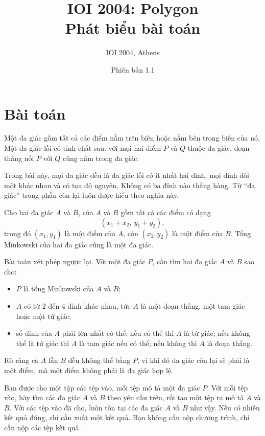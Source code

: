 \documentclass[11pt]{article}
\title{IOI 2004: Polygon\\{\large Phát biểu bài toán}}
\author{IOI 2004, Athens}
\date{Phiên bản 1.1}
\begin{document}
\maketitle


\section{Bài toán}

Một đa giác gồm tất cả các điểm nằm trên biên hoặc nằm bên trong biên của nó.
Một đa giác lồi có tính chất sau: với mọi hai điểm \(P\) và \(Q\) thuộc đa
giác, đoạn thẳng nối \(P\) với \(Q\) cũng nằm trong đa giác.

Trong bài này, mọi đa giác đều là đa giác lồi có ít nhất hai đỉnh, mọi đỉnh
đôi một khác nhau và có tọa độ nguyên. Không có ba đỉnh nào thẳng hàng. Từ
``đa giác'' trong phần còn lại luôn được hiểu theo nghĩa này.

Cho hai đa giác \(A\) và \(B\),  của \(A\) và \(B\) gồm
tất cả các điểm có dạng
\[
  (x_1+x_2,\ y_1+y_2),
\]
trong đó \((x_1,y_1)\) là một điểm của \(A\), còn \((x_2,y_2)\) là một điểm
của \(B\). Tổng Minkowski của hai đa giác cũng là một đa giác.

Bài toán xét phép ngược lại. Với một đa giác \(P\), cần tìm hai đa giác
\(A\) và \(B\) sao cho:
\begin{itemize}
  \item \(P\) là tổng Minkowski của \(A\) và \(B\);
  \item \(A\) có từ \(2\) đến \(4\) đỉnh khác nhau, tức \(A\) là một đoạn
  thẳng, một tam giác hoặc một tứ giác;
  \item số đỉnh của \(A\) phải lớn nhất có thể: nếu có thể thì \(A\) là tứ
  giác; nếu không thể là tứ giác thì \(A\) là tam giác nếu có thể; nếu không
  thì \(A\) là đoạn thẳng.
\end{itemize}

Rõ ràng cả \(A\) lẫn \(B\) đều không thể bằng \(P\), vì khi đó đa giác còn
lại sẽ phải là một điểm, mà một điểm không phải là đa giác hợp lệ.

Bạn được cho một tập các tệp vào, mỗi tệp mô tả một đa giác \(P\). Với mỗi
tệp vào, hãy tìm các đa giác \(A\) và \(B\) theo yêu cầu trên, rồi tạo một
tệp ra mô tả \(A\) và \(B\). Với các tệp vào đã cho, luôn tồn tại các đa giác
\(A\) và \(B\) như vậy. Nếu có nhiều kết quả đúng, chỉ cần xuất một kết quả.
Bạn không cần nộp chương trình, chỉ cần nộp các tệp kết quả.
\end{document}
